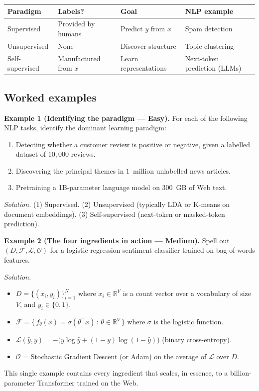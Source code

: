 \documentclass[12pt,a4paper]{report}
\theoremstyle{definition}
\theoremstyle{remark}
\begin{document}
\begin{center}
\begin{tabular}{|l|l|l|l|}
\hline
\textbf{Paradigm} & \textbf{Labels?} & \textbf{Goal} & \textbf{NLP example} \\
\hline
Supervised & Provided by humans & Predict $y$ from $x$ & Spam detection \\
Unsupervised & None & Discover structure & Topic clustering \\
Self-supervised & Manufactured from $x$ & Learn representations & Next-token prediction (LLMs) \\
\hline
\end{tabular}
\end{center}

\subsection{Worked examples}

\textbf{Example 1 (Identifying the paradigm --- Easy).}
For each of the following NLP tasks, identify the dominant learning paradigm:
\begin{enumerate}
    \item Detecting whether a customer review is positive or negative, given a labelled dataset of $10{,}000$ reviews.
    \item Discovering the principal themes in $1$~million unlabelled news articles.
    \item Pretraining a 1B-parameter language model on $300$~GB of Web text.
\end{enumerate}

\textit{Solution.} (1) Supervised. (2) Unsupervised (typically LDA or K-means on document embeddings). (3) Self-supervised (next-token or masked-token prediction).

\medskip

\textbf{Example 2 (The four ingredients in action --- Medium).}
Spell out $(D, \mathcal{F}, \mathcal{L}, \mathcal{O})$ for a logistic-regression sentiment classifier trained on bag-of-words features.

\textit{Solution.}
\begin{itemize}
    \item $D = \{(x_i, y_i)\}_{i=1}^N$ where $x_i \in \mathbb{R}^V$ is a count vector over a vocabulary of size $V$, and $y_i \in \{0, 1\}$.
    \item $\mathcal{F} = \big\{\, f_\theta(x) = \sigma(\theta^\top x) \,:\, \theta \in \mathbb{R}^V \,\big\}$ where $\sigma$ is the logistic function.
    \item $\mathcal{L}(\hat{y}, y) = -\big(y \log \hat{y} + (1 - y)\log(1 - \hat{y})\big)$ (binary cross-entropy).
    \item $\mathcal{O}$ = Stochastic Gradient Descent (or Adam) on the average of $\mathcal{L}$ over $D$.
\end{itemize}
This single example contains every ingredient that scales, in essence, to a billion-parameter Transformer trained on the Web.
\end{document}
